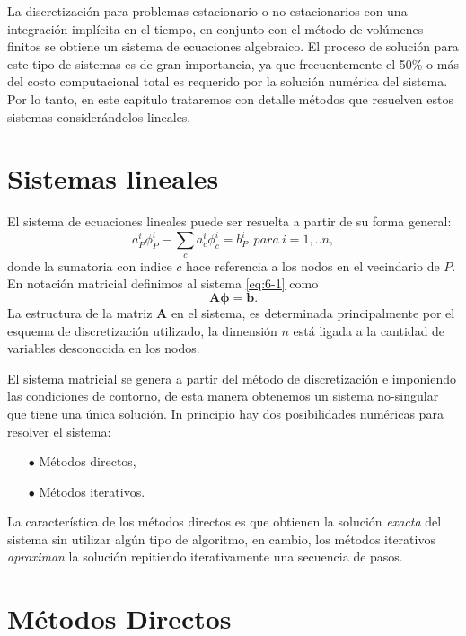 \documentclass[a4paper,10pt, oneside]{book}
\begin{document}
La discretización para problemas estacionario o no-estacionarios con una integración implícita en el tiempo, en conjunto con el método de volúmenes finitos se obtiene un sistema de ecuaciones algebraico. El proceso de solución para este tipo de sistemas es de gran importancia, ya que frecuentemente el 50\% o más del costo computacional total es requerido por la solución numérica del sistema. Por lo tanto, en este capítulo trataremos con detalle métodos que resuelven estos sistemas considerándolos lineales.

\section{Sistemas lineales}

El sistema de ecuaciones lineales puede ser resuelta a partir de su forma general:
\begin{equation}
	a^i_P \phi^i_P - \sum_c a_c^i \phi_c^i = b_P^i ~~ para ~ i=1,..n,
	\label{eq:6-1}
\end{equation}
donde la sumatoria con indice $c$ hace referencia a los nodos en el vecindario de $P$. En notación matricial definimos al sistema \ref{eq:6-1} como
\begin{equation}
	\mathbf{A \phi = b}.
	\label{eq:6-2}
\end{equation}
La estructura de la matriz $\mathbf{A}$ en el sistema, es determinada principalmente por el esquema de discretización utilizado, la dimensión $n$ está ligada a la cantidad de variables desconocida en los nodos.

El sistema matricial se genera a partir del método de discretización e imponiendo las condiciones de contorno, de esta manera obtenemos un sistema no-singular que tiene una única solución. In principio hay dos posibilidades numéricas para resolver el sistema:
\begin{itemize}
	\item[$\bullet$] Métodos directos,
	\item[$\bullet$] Métodos iterativos.
\end{itemize}
La característica de los métodos directos es que obtienen la solución \textit{exacta} del sistema sin utilizar algún tipo de algoritmo, en cambio, los métodos iterativos \textit{aproximan} la solución repitiendo iterativamente una secuencia de pasos.

\section{Métodos Directos}
\end{document}
